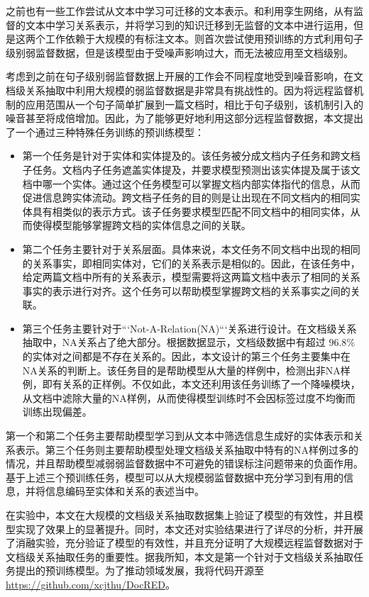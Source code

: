 之前也有一些工作尝试从文本中学习可迁移的文本表示。\citet{wu2019open}和\citet{gao2019neural}利用孪生网络，从有监督的文本中学习关系表示，并将学习到的知识迁移到无监督的文本中进行运用，但是这两个工作依赖于大规模的有标注文本。\citet{soares2019matching}则首次尝试使用预训练的方式利用句子级别弱监督数据，但是该模型由于受噪声影响过大，而无法被应用至文档级别。

考虑到之前在句子级别弱监督数据上开展的工作\cite{lin2016neural,zeng2015distant}会不同程度地受到噪音影响，在文档级关系抽取中利用大规模的弱监督数据是非常具有挑战性的。因为将远程监督机制的应用范围从一个句子简单扩展到一篇文档时，相比于句子级别，该机制引入的噪音甚至将成倍增加。因此，为了能够更好地利用这部分远程监督数据，本文提出了一个通过三种特殊任务训练的预训练模型：
\begin{itemize}
	\item 第一个任务是针对于实体和实体提及的。该任务被分成文档内子任务和跨文档子任务。文档内子任务遮盖实体提及，并要求模型预测出该实体提及属于该文档中哪一个实体。通过这个任务模型可以掌握文档内部实体指代的信息，从而促进信息跨实体流动。跨文档子任务的目的则是让出现在不同文档内的相同实体具有相类似的表示方式。该子任务要求模型匹配不同文档中的相同实体，从而使得模型能够掌握跨文档的实体信息之间的关联。
	\item 第二个任务主要针对于关系层面。具体来说，本文任务不同文档中出现的相同的关系事实，即相同实体对，它们的关系表示是相似的。因此，在该任务中，给定两篇文档中所有的关系表示，模型需要将这两篇文档中表示了相同的关系事实的表示进行对齐。这个任务可以帮助模型掌握跨文档的关系事实之间的关联。
	\item 第三个任务主要针对于```Not-A-Relation(NA)```关系进行设计。在文档级关系抽取中，NA关系占了绝大部分。根据数据显示，文档级数据中有超过 $96.8\%$ 的实体对之间都是不存在关系的\cite{yao2019docred}。因此，本文设计的第三个任务主要集中在NA关系的判断上。该任务目的是帮助模型从大量的样例中，检测出非NA样例，即有关系的正样例。不仅如此，本文还利用该任务训练了一个降噪模块，从文档中滤除大量的NA样例，从而使得模型训练时不会因标签过度不均衡而训练出现偏差。
\end{itemize}

第一个和第二个任务主要帮助模型学习到从文本中筛选信息生成好的实体表示和关系表示。第三个任务则主要帮助模型处理文档级关系抽取中特有的NA样例过多的情况，并且帮助模型减弱弱监督数据中不可避免的错误标注问题带来的负面作用。基于上述三个预训练任务，模型可以从大规模弱监督数据中充分学习到有用的信息，并将信息编码至实体和关系的表述当中。

在实验中，本文在大规模的文档级关系抽取数据集上验证了模型的有效性，并且模型实现了效果上的显著提升。同时，本文还对实验结果进行了详尽的分析，并开展了消融实验，充分验证了模型的有效性，并且充分证明了大规模远程监督数据对于文档级关系抽取任务的重要性。据我所知，本文是第一个针对于文档级关系抽取任务提出的预训练模型。为了推动领域发展，我将代码开源至 \url{https://github.com/xcjthu/DocRED}。

